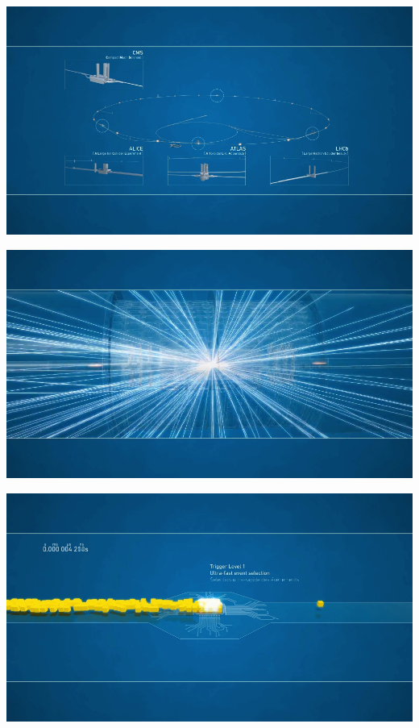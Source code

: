 \documentclass{beamer}
\begin{document}
\begin{frame}
    \includegraphics[width=\textwidth]{video/detectors.png}
\end{frame}

\begin{frame}
    \includegraphics[width=\textwidth]{video/collisions.png}
\end{frame}

\begin{frame}
    \includegraphics[width=\textwidth]{video/trigger1.png}
\end{frame}
\end{document}
